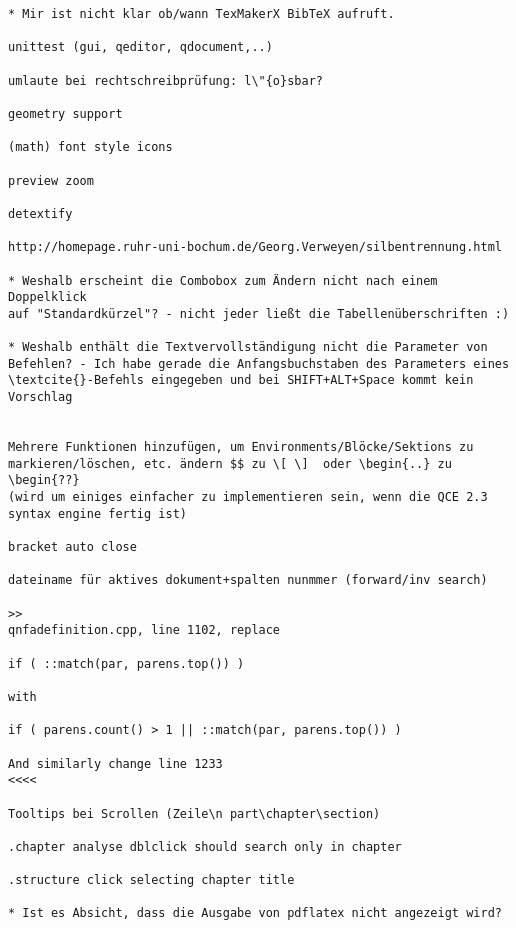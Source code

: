 \documentclass[10pt,a4paper,landscape]{report}
\begin{document}
\begin{verbatim}
* Mir ist nicht klar ob/wann TexMakerX BibTeX aufruft. 

unittest (gui, qeditor, qdocument,..)

umlaute bei rechtschreibprüfung: l\"{o}sbar?

geometry support

(math) font style icons

preview zoom

detextify

http://homepage.ruhr-uni-bochum.de/Georg.Verweyen/silbentrennung.html

* Weshalb erscheint die Combobox zum Ändern nicht nach einem Doppelklick
auf "Standardkürzel"? - nicht jeder ließt die Tabellenüberschriften :)

* Weshalb enthält die Textvervollständigung nicht die Parameter von
Befehlen? - Ich habe gerade die Anfangsbuchstaben des Parameters eines
\textcite{}-Befehls eingegeben und bei SHIFT+ALT+Space kommt kein Vorschlag


Mehrere Funktionen hinzufügen, um Environments/Blöcke/Sektions zu markieren/löschen, etc. ändern $$ zu \[ \]  oder \begin{..} zu \begin{??} 
(wird um einiges einfacher zu implementieren sein, wenn die QCE 2.3 syntax engine fertig ist)

bracket auto close

dateiname für aktives dokument+spalten nunmmer (forward/inv search)

>>
qnfadefinition.cpp, line 1102, replace

if ( ::match(par, parens.top()) )

with

if ( parens.count() > 1 || ::match(par, parens.top()) )

And similarly change line 1233
<<<<

Tooltips bei Scrollen (Zeile\n part\chapter\section)

.chapter analyse dblclick should search only in chapter 

.structure click selecting chapter title

* Ist es Absicht, dass die Ausgabe von pdflatex nicht angezeigt wird?


\end{verbatim}
\end{document}
